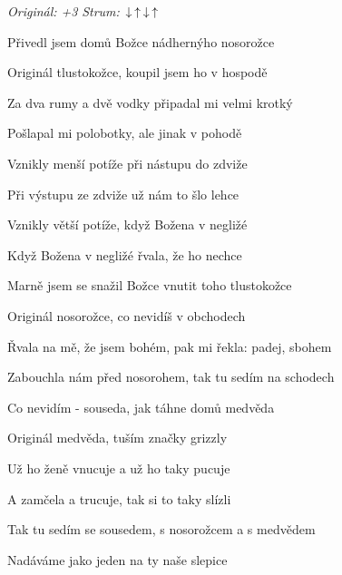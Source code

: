 \begin{song}


\begin{headerbox}
 \quad
\textit{Originál: +3} \quad
\textit{Strum:} $\Down\Up\Down\Up$
\end{headerbox}

\begin{hchordbox}
\end{hchordbox}

\Large

\bigskip

Přivedl jsem domů Božce nádhernýho nosorožce \par
{}Originál tlustokožce, koupil jsem ho v hospodě \par
{}Za dva rumy a dvě vodky připadal mi velmi krotký \par
{}Pošlapal mi polobotky, ale jinak v pohodě \par

\bigskip

Vznikly menší potíže při nástupu do zdviže \par
{}Při výstupu ze zdviže už nám to šlo lehce \par
{}Vznikly větší potíže, když Božena v negližé \par
{}Když Božena v negližé řvala, že ho nechce \par

\bigskip

Marně jsem se snažil Božce vnutit toho tlustokožce \par
{}Originál nosorožce, co nevidíš v obchodech \par
{}Řvala na mě, že jsem bohém, pak mi řekla: padej, sbohem \par
{}Zabouchla nám před nosorohem, tak tu sedím na schodech \par

\bigskip

Co nevidím - souseda, jak táhne domů medvěda \par
{}Originál medvěda, tuším značky grizzly \par
{}Už ho ženě vnucuje a už ho taky pucuje \par
A zamčela a trucuje, tak si to taky slízli \par

\bigskip

Tak tu sedím se sousedem, s nosorožcem a s medvědem \par
{}Nadáváme jako jeden na ty naše slepice \par

\end{song}
